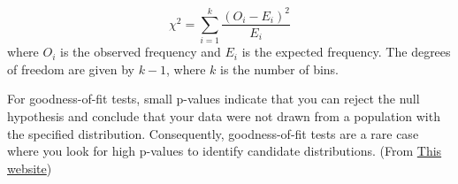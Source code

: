 \begin{equation}
    \chi^2 = \sum_{i=1}^{k} \frac{(O_i - E_i)^2}{E_i}
\end{equation}
where \(O_i\) is the observed frequency and \(E_i\) is the expected frequency. The degrees of freedom are given by \(k-1\), where \(k\) is the number of bins.

For goodness-of-fit tests, small p-values indicate that you can reject the null hypothesis and conclude that your data were not drawn from a population with the specified distribution. Consequently, goodness-of-fit tests are a rare case where you look for high p-values to identify candidate distributions. 
(From \href{https://statisticsbyjim.com/hypothesis-testing/goodness-fit-tests-discrete-distributions/}{This website})
